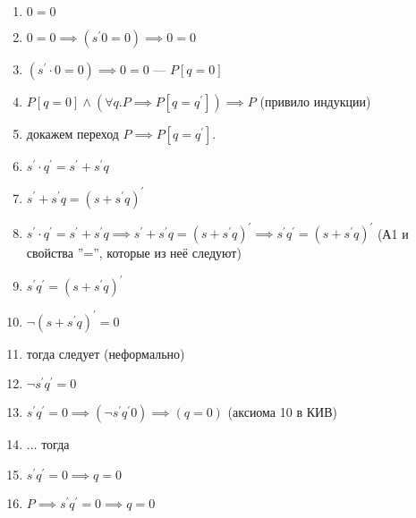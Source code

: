 \documentclass[10pt]{article}
\begin{document}
\begin{enumerate}
    \item $0 = 0$
    \item $0 = 0 \implies (s^\prime 0 = 0) \implies 0 = 0$
    \item $(s^\prime \cdot 0 = 0) \implies 0 = 0$ --- $P[q=0]$
    \item $P[q = 0] \land (\forall q. P \implies P[q = q^\prime]) \implies P$ (привило индукции)
    \item[] докажем переход $P \implies P[q = q^\prime]$.
    \item $s^\prime \cdot q^\prime = s^\prime + s^\prime q$
    \item $s^\prime + s^\prime q = (s + s^\prime q)^\prime$
    \item $s^\prime \cdot q^\prime = s^\prime + s^\prime q \implies s^\prime + s^\prime q = (s + s^\prime q)^\prime \implies s^\prime q^\prime = (s + s^\prime q)^\prime$ (А1 и свойства ''='', которые из неё следуют) 
    \item $s^\prime q^\prime = (s + s^\prime q)^\prime$ 
    \item $\neg (s + s^\prime q)^\prime = 0$
    \item [] тогда следует (неформально)
    \item $\neg s^\prime q^\prime = 0$
    \item $s^\prime q^\prime = 0 \implies (\neg s^\prime q^\prime 0) \implies (q = 0)$ (аксиома 10 в КИВ)
    \item[] $\ldots$ тогда
    \item $s^\prime q^\prime = 0 \implies q = 0$
    \item $P \implies s^\prime q^\prime = 0 \implies q = 0$    
\end{enumerate}
\end{document}
